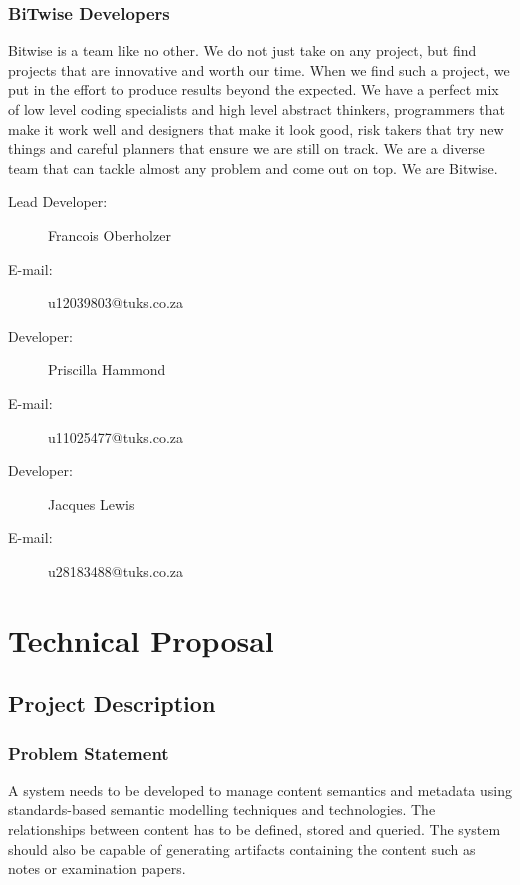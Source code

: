 \documentclass[a4paper]{article}
\begin{document}
			\subsubsection{BiTwise Developers}

Bitwise is a team like no other. We do not just take on any project, but find projects that are innovative and worth our time. When we find such a project, we put in the effort to produce results beyond the expected. We have a perfect mix of low level coding specialists and high level abstract thinkers, programmers that make it work well and designers that make it look good, risk takers that try new things and careful planners that ensure we are still on track. We are a diverse team that can tackle almost any problem and come out on top. We are Bitwise.

				\begin{description}
					\item[Lead Developer:] Francois Oberholzer
					\item[E-mail:] u12039803@tuks.co.za
				\end{description}

				\begin{description}
					\item[Developer:] Priscilla Hammond
					\item[E-mail:] u11025477@tuks.co.za
				\end{description}

				\begin{description}
					\item[Developer:] Jacques Lewis
					\item[E-mail:] u28183488@tuks.co.za
				\end{description}


	\section{Technical Proposal}

		\subsection{Project Description}

			\subsubsection{Problem Statement}

A system needs to be developed to manage content semantics and metadata using standards-based semantic modelling techniques and technologies. The relationships between content has to be defined, stored and queried. The system should also be capable of generating artifacts containing the content such as notes or examination papers.
\end{document}

